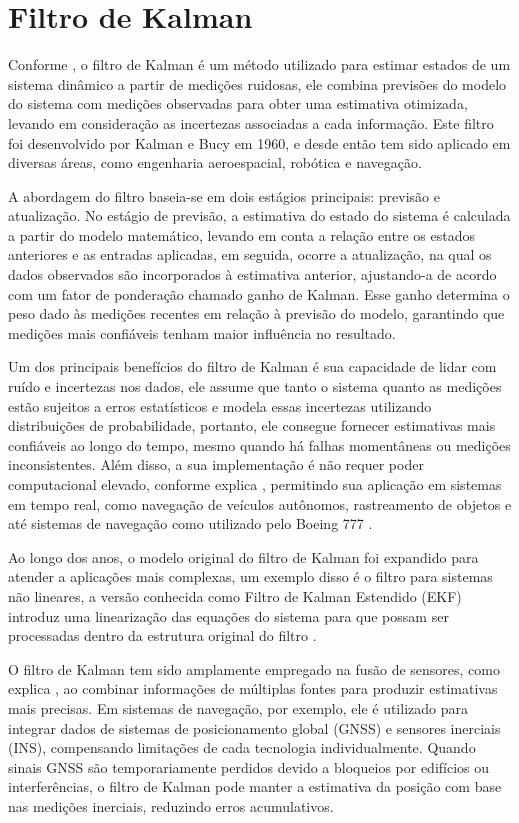 \section{Filtro de Kalman}

Conforme \citep{kalman1960}, o filtro de Kalman é um método utilizado para estimar estados de um sistema dinâmico a partir de medições ruidosas, ele combina previsões do modelo do sistema com medições observadas para obter uma estimativa otimizada, levando em consideração as incertezas associadas a cada informação. Este filtro foi desenvolvido por Kalman e Bucy em 1960, e desde então tem sido aplicado em diversas áreas, como engenharia aeroespacial, robótica e navegação.

A abordagem do filtro baseia-se em dois estágios principais: previsão e atualização. No estágio de previsão, a estimativa do estado do sistema é calculada a partir do modelo matemático, levando em conta a relação entre os estados anteriores e as entradas aplicadas, em seguida, ocorre a atualização, na qual os dados observados são incorporados à estimativa anterior, ajustando-a de acordo com um fator de ponderação chamado ganho de Kalman. Esse ganho determina o peso dado às medições recentes em relação à previsão do modelo, garantindo que medições mais confiáveis tenham maior influência no resultado.

Um dos principais benefícios do filtro de Kalman é sua capacidade de lidar com ruído e incertezas nos dados, ele assume que tanto o sistema quanto as medições estão sujeitos a erros estatísticos e modela essas incertezas utilizando distribuições de probabilidade, portanto, ele consegue fornecer estimativas mais confiáveis ao longo do tempo, mesmo quando há falhas momentâneas ou medições inconsistentes. Além disso, a sua implementação é não requer poder computacional elevado, conforme explica \citep{gan2001}, permitindo sua aplicação em sistemas em tempo real, como navegação de veículos autônomos, rastreamento de objetos e até sistemas de navegação como utilizado pelo Boeing 777 \citep{cipra1993}.

Ao longo dos anos, o modelo original do filtro de Kalman foi expandido para atender a aplicações mais complexas, um exemplo disso é o filtro para sistemas não lineares, a versão conhecida como Filtro de Kalman Estendido (EKF) introduz uma linearização das equações do sistema para que possam ser processadas dentro da estrutura original do filtro \citep{welch2001}.

O filtro de Kalman tem sido amplamente empregado na fusão de sensores, como explica \citep{li2015}, ao combinar informações de múltiplas fontes para produzir estimativas mais precisas. Em sistemas de navegação, por exemplo, ele é utilizado para integrar dados de sistemas de posicionamento global (GNSS) e sensores inerciais (INS), compensando limitações de cada tecnologia individualmente. Quando sinais GNSS são temporariamente perdidos devido a bloqueios por edifícios ou interferências, o filtro de Kalman pode manter a estimativa da posição com base nas medições inerciais, reduzindo erros acumulativos.

